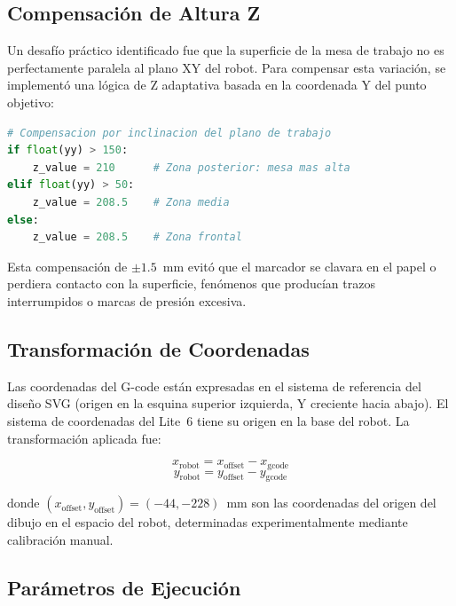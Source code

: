 \documentclass[journal,compsoc]{IEEEtran}
\begin{document}
\subsection{Compensación de Altura Z}

Un desafío práctico identificado fue que la superficie de la mesa de trabajo no es perfectamente paralela al plano XY del robot. Para compensar esta variación, se implementó una lógica de Z adaptativa basada en la coordenada Y del punto objetivo:

\begin{lstlisting}[language=Python, caption=Compensación de altura Z por zona del área de trazado.]
# Compensacion por inclinacion del plano de trabajo
if float(yy) > 150:
    z_value = 210      # Zona posterior: mesa mas alta
elif float(yy) > 50:
    z_value = 208.5    # Zona media
else:
    z_value = 208.5    # Zona frontal
\end{lstlisting}

Esta compensación de $\pm 1.5$~mm evitó que el marcador se clavara en el papel o perdiera contacto con la superficie, fenómenos que producían trazos interrumpidos o marcas de presión excesiva.

\subsection{Transformación de Coordenadas}

Las coordenadas del G-code están expresadas en el sistema de referencia del diseño SVG (origen en la esquina superior izquierda, Y creciente hacia abajo). El sistema de coordenadas del Lite~6 tiene su origen en la base del robot. La transformación aplicada fue:

\begin{equation}
    x_{\text{robot}} = x_{\text{offset}} - x_{\text{gcode}}
    \label{eq:transform_x}
\end{equation}
\begin{equation}
    y_{\text{robot}} = y_{\text{offset}} - y_{\text{gcode}}
    \label{eq:transform_y}
\end{equation}

donde $(x_{\text{offset}}, y_{\text{offset}}) = (-44, -228)$~mm son las coordenadas del origen del dibujo en el espacio del robot, determinadas experimentalmente mediante calibración manual.

\subsection{Parámetros de Ejecución}
\end{document}
